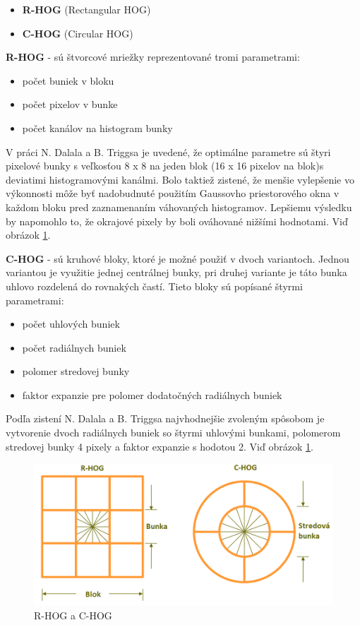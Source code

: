 \begin{itemize}
\item \textbf{R-HOG} (Rectangular HOG)
\item \textbf{C-HOG} (Circular HOG)
\end{itemize}


\textbf{R-HOG} - sú štvorcové mriežky reprezentované tromi parametrami:
\begin{itemize}
\item počet buniek v bloku
\item počet pixelov v bunke
\item počet kanálov na histogram bunky
\end{itemize}

V práci N. Dalala a B. Triggsa je uvedené, že optimálne parametre sú štyri pixelové bunky s veľkosťou  8 x 8 na jeden blok (16 x 16 pixelov na blok)s deviatimi histogramovými kanálmi. Bolo taktiež zistené, že menšie vylepšenie vo výkonnosti môže byť nadobudnuté použitím Gaussovho priestorového okna v každom bloku pred zaznamenaním váhovaných histogramov. Lepšiemu výsledku by napomohlo to, že okrajové pixely by boli ováhované nižšími hodnotami. Viď obrázok \ref{HOGimg}.

\textbf{C-HOG} - sú kruhové bloky, ktoré je možné použiť v dvoch variantoch. Jednou variantou je využitie jednej centrálnej bunky, pri druhej variante je táto bunka uhlovo rozdelená do rovnakých častí. Tieto bloky sú popísané štyrmi parametrami:

\begin{itemize}
\item počet uhlových buniek
\item počet radiálnych buniek
\item polomer stredovej bunky
\item faktor expanzie pre polomer dodatočných radiálnych buniek
\end{itemize}

Podľa zistení N. Dalala a B. Triggsa najvhodnejšie zvoleným spôsobom je vytvorenie dvoch radiálnych buniek so štyrmi uhlovými bunkami, polomerom stredovej bunky 4 pixely a faktor expanzie s hodotou 2. Viď obrázok \ref{HOGimg}.


\begin{figure}[H]
  \centering
  \includegraphics[width=14cm]{img/HOGimg.png}
  \caption{R-HOG a C-HOG}
  \label{HOGimg}
\end{figure}

